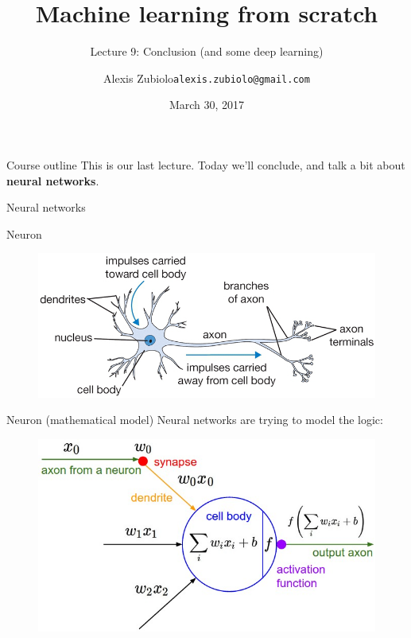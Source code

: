 \documentclass{beamer}
\title{Machine learning from scratch}
\subtitle{Lecture 9: Conclusion (and some deep learning)}
\author{Alexis Zubiolo\newline\texttt{alexis.zubiolo@gmail.com}}
\institute{Data Science Team Lead @ Adcash}
\date{March 30, 2017}
\newcommand{\1}[1]{\mathbbm{1}\left[#1\right]}
\newcommand{\pv}{\pause\vfill}
\begin{document}
\begin{frame}
  \titlepage
\end{frame}

\begin{frame}{Course outline}
This is our last lecture.
\pv
Today we'll conclude, and talk a bit about \textbf{neural networks}.
\end{frame}

\begin{frame}
\begin{center}
\Huge{Neural networks}
\end{center}
\end{frame}

\begin{frame}{Neuron}
\begin{figure}
\centering
\includegraphics[width=\textwidth]{images/neuron.png}
\end{figure}
\end{frame}

\begin{frame}{Neuron (mathematical model)}
Neural networks are trying to model the logic:
\begin{figure}
\centering
\includegraphics[width=\textwidth]{images/neuron_model.jpeg}
\end{figure}
\end{frame}
\end{document}
